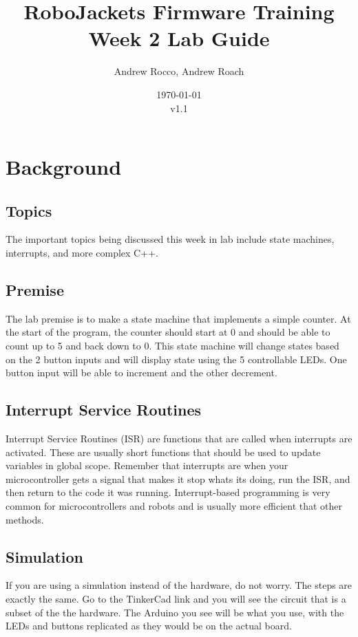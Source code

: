 \documentclass{article}
\title{RoboJackets Firmware Training Week 2 Lab Guide}
\author{Andrew Rocco, Andrew Roach}
\date{\today\\v1.1}
\begin{document}
\maketitle{}
\setcounter{tocdepth}{2}
\tableofcontents
\pagebreak


\section{Background}
    \subsection{Topics}
        The important topics being discussed this week in lab include state machines, interrupts, and more complex C++.
    \subsection{Premise}
        The lab premise is to make a state machine that implements a simple counter. At the start of the program, the counter should start at 0 and should be able to count up to 5 and back down to 0. This state machine will change states based on the 2 button inputs and will display state using the 5 controllable LEDs. One button input will be able to increment and the other decrement.
    \subsection{Interrupt Service Routines}
        Interrupt Service Routines (ISR) are functions that are called when interrupts are activated. These are usually short functions that should be used to update variables in global scope. Remember that interrupts are when your microcontroller gets a signal that makes it stop whats its doing, run the ISR, and then return to the code it was running. Interrupt-based programming is very common for microcontrollers and robots and is usually more efficient that other methods.
        
    \subsection{Simulation}
        If you are using a simulation instead of the hardware, do not worry.  The steps are exactly the same.  Go to the TinkerCad link and you will see the circuit that is a subset of the the hardware. The Arduino you see will be what you use, with the LEDs and buttons replicated as they would be on the actual board. 
        
\end{document}
